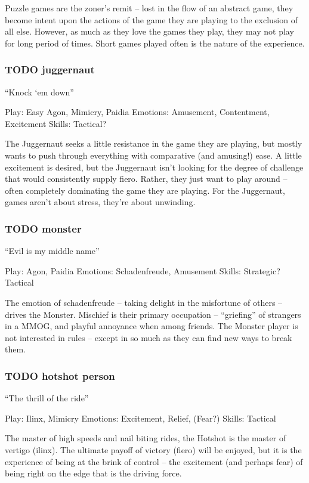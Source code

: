 \documentclass[11pt]{article}
\begin{document}
Puzzle games are the zoner’s remit – lost in the flow of an abstract
game, they become intent upon the actions of the game they are
playing to the exclusion of all else. However, as much as they love
the games they play, they may not play for long period of
times. Short games played often is the nature of the experience.



\subsubsection{{\bfseries\sffamily TODO} juggernaut}
\label{sec-2-2-18}


“Knock ‘em down”

Play: Easy Agon, Mimicry, Paidia
Emotions: Amusement, Contentment, Excitement
Skills: Tactical?

The Juggernaut seeks a little resistance in the game they are
playing, but mostly wants to push through everything with comparative
(and amusing!) ease. A little excitement is desired, but the
Juggernaut isn’t looking for the degree of challenge that would
consistently supply fiero. Rather, they just want to play around –
often completely dominating the game they are playing. For the
Juggernaut, games aren’t about stress, they’re about unwinding. 
\subsubsection{{\bfseries\sffamily TODO} monster}
\label{sec-2-2-19}


“Evil is my middle name”

Play: Agon, Paidia
Emotions: Schadenfreude, Amusement
Skills: Strategic? Tactical 

The emotion of schadenfreude – taking delight in the misfortune of
others – drives the Monster. Mischief is their primary occupation –
“griefing” of strangers in a MMOG, and playful annoyance when
among friends. The Monster player is not interested in rules – except
in so much as they can find new ways to break them.
\subsubsection{{\bfseries\sffamily TODO} hotshot person}
\label{sec-2-2-20}


“The thrill of the ride”

Play: Ilinx, Mimicry
Emotions: Excitement, Relief, (Fear?)
Skills: Tactical

The master of high speeds and nail biting rides, the Hotshot is the
master of vertigo (ilinx). The ultimate payoff of victory (fiero)
will be enjoyed, but it is the experience of being at the brink of
control – the excitement (and perhaps fear) of being right on the
edge that is the driving force. 
\end{document}
